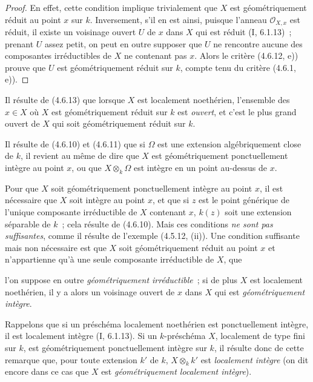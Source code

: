 \begin{proof}
En effet, cette condition implique trivialement que $X$ est géométriquement
réduit au point $x$ sur $k$. Inversement, s'il en est ainsi, puisque l'anneau
$\mathcal O_{X,x}$ est réduit, il existe un voisinage ouvert $U$ de $x$ dans
$X$ qui est réduit (I, 6.1.13)~; prenant $U$ assez petit, on peut en outre
supposer que $U$ ne rencontre aucune des composantes irréductibles de $X$ ne
contenant pas $x$. Alors le critère (4.6.12, e)) prouve que $U$ est
géométriquement réduit sur $k$, compte tenu du critère (4.6.1, e)).
\end{proof}

Il résulte de (4.6.13) que lorsque $X$ est localement noethérien, l'ensemble
des $x\in X$ où $X$ est géométriquement réduit sur $k$ est \emph{ouvert}, et
c'est le plus grand ouvert de $X$ qui soit géométriquement réduit sur $k$.

\begin{env}[4.6.14]
\label{IV.2.4.6.14-fr}
Il résulte de (4.6.10) et (4.6.11) que si $\Omega$ est une extension
algébriquement close de $k$, il revient au même de dire que $X$ est
géométriquement ponctuellement intègre au point $x$, ou que $X\otimes_k\Omega$
est intègre en un point au-dessus de $x$.

Pour que $X$ soit géométriquement ponctuellement intègre au point $x$, il est
nécessaire que $X$ soit intègre au point $x$, et que si $z$ est le point
générique de l'unique composante irréductible de $X$ contenant $x$, $k(z)$ soit
une extension séparable de $k$~; cela résulte de (4.6.10). Mais ces conditions
\emph{ne sont pas suffisantes}, comme il résulte de l'exemple (4.5.12, (ii)).
Une condition suffisante mais non nécessaire est que $X$ soit géométriquement
réduit au point $x$ et n'appartienne qu'à une seule composante irréductible de
$X$, que


l'on suppose en outre \emph{géométriquement irréductible}~; si de plus $X$ est
localement noethérien, il y a alors un voisinage ouvert de $x$ dans $X$ qui est
\emph{géométriquement intègre}.
\end{env}

Rappelons que si un préschéma localement noethérien est ponctuellement intègre,
il est localement intègre (I, 6.1.13). Si un $k$-préschéma $X$, localement de
type fini sur $k$, est géométriquement ponctuellement intègre sur $k$, il
résulte donc de cette remarque que, pour toute extension $k'$ de $k$,
$X\otimes_k k'$ est \emph{localement intègre} (on dit encore dans ce cas que
$X$ est \emph{géométriquement localement intègre}).

